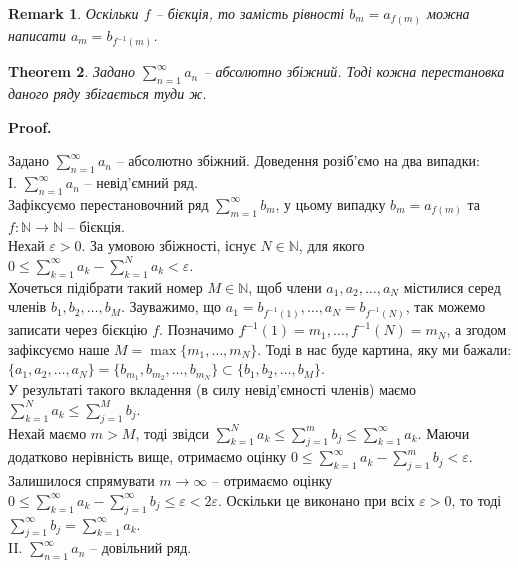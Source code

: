 \documentclass[a4paper, 10pt]{article}
\makeatletter
\def\qed{$\blacksquare$}
\theoremstyle{theoremdd}
\newtheorem{theorem}{Theorem}[subsection]
\theoremstyle{theoremdd}
\theoremstyle{theoremdd}
\theoremstyle{theoremdd}
\theoremstyle{theoremdd}
\theoremstyle{theoremdd}
\theoremstyle{theoremdd}
\newtheorem{remark}[theorem]{Remark}
\theoremstyle{theoremdd}
\theoremstyle{theoremdd}
\renewenvironment{proof}[1][Proof.\\]{\par
\pushQED{\hfill \qed}%
\normalfont \topsep6\p@\@plus6\p@\relax
\trivlist
\item\relax
{\bfseries
#1\@addpunct{.}}\hspace\labelsep\ignorespaces
}{%
\popQED\endtrivlist\@endpefalse
}
\makeatother
\begin{document}
\begin{remark}
Оскільки $f$ -- бієкція, то замість рівності $b_m = a_{f(m)}$ можна написати $a_m = b_{f^{-1}(m)}$.
\end{remark}

\begin{theorem}
Задано $\displaystyle \sum_{n=1}^\infty a_n$ -- абсолютно збіжний. Тоді кожна перестановка даного ряду збігається туди ж.
\end{theorem}

\begin{proof}
Задано $\displaystyle \sum_{n=1}^\infty a_n$ -- абсолютно збіжний. Доведення розіб'ємо на два випадки:\\
I. $\displaystyle\sum_{n=1}^\infty a_n$ -- невід'ємний ряд.\\
Зафіксуємо перестановочний ряд $\displaystyle\sum_{m=1}^\infty b_m$, у цьому випадку $b_m = a_{f(m)}$ та $f \colon \mathbb{N} \to \mathbb{N}$ -- бієкція.\\
Нехай $\varepsilon > 0$. За умовою збіжності, існує $N \in \mathbb{N}$, для якого $0 \leq \displaystyle\sum_{k=1}^\infty a_k - \sum_{k=1}^N a_k < \varepsilon$.\\
Хочеться підібрати такий номер $M \in \mathbb{N}$, щоб члени $a_1,a_2,\dots,a_N$ містилися серед членів $b_1,b_2,\dots,b_M$. Зауважимо, що $a_1 = b_{f^{-1}(1)},\dots,a_N = b_{f^{-1}(N)}$, так можемо записати через бієкцію $f$. Позначимо $f^{-1}(1) = m_1,\dots,f^{-1}(N) = m_N$, а згодом зафіксуємо наше $M = \max\{m_1,\dots,m_N\}$. Тоді в нас буде картина, яку ми бажали:\\
$\{a_1,a_2,\dots,a_N\} = \{b_{m_1}, b_{m_2},\dots, b_{m_N}\} \subset \{b_1,b_2,\dots,b_M\}$.\\
У результаті такого вкладення (в силу невід'ємності членів) маємо $\displaystyle\sum_{k=1}^N a_k \leq \sum_{j=1}^M b_j$.\\
Нехай маємо $m > M$, тоді звідси $\displaystyle\sum_{k=1}^N a_k \leq \sum_{j=1}^m b_j \leq \sum_{k=1}^\infty a_k$. Маючи додатково нерівність вище, отримаємо оцінку $0 \leq \displaystyle\sum_{k=1}^\infty a_k - \sum_{j=1}^m b_j < \varepsilon$. Залишилося спрямувати $m \to \infty$ -- отримаємо оцінку $\displaystyle 0 \leq \sum_{k=1}^\infty a_k - \sum_{j=1}^\infty b_j \leq \varepsilon < 2 \varepsilon$. Оскільки це виконано при всіх $\varepsilon > 0$, то тоді $\displaystyle\sum_{j=1}^\infty b_j = \sum_{k=1}^\infty a_k$.
\bigskip \\
II. $\displaystyle\sum_{n=1}^\infty a_n$ -- довільний ряд.\\

\end{proof}
\end{document}
